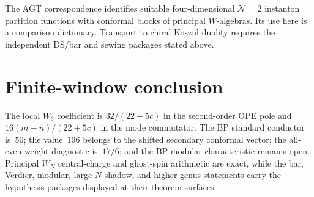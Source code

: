 \begin{conjecture}
\label{conj:agt-w-algebra}
The AGT correspondence identifies suitable four-dimensional
$\mathcal N=2$ instanton partition functions with conformal blocks of
principal $W$-algebras.  Its use here is a comparison dictionary.
Transport to chiral Koszul duality requires the independent DS/bar
and sewing packages stated above.
\end{conjecture}

\section{Finite-window conclusion}

The local $W_3$ coefficient is
$32/(22+5c)$ in the second-order OPE pole and
$16(m-n)/(22+5c)$ in the mode commutator.  The BP standard conductor
is~$50$; the value~$196$ belongs to the shifted secondary conformal
vector; the all-even weight diagnostic is~$17/6$; and the BP modular
characteristic remains open.  Principal $W_N$ central-charge and
ghost-spin arithmetic are exact, while the bar, Verdier, modular,
large-$N$ shadow, and higher-genus statements carry the hypothesis
packages displayed at their theorem surfaces.
